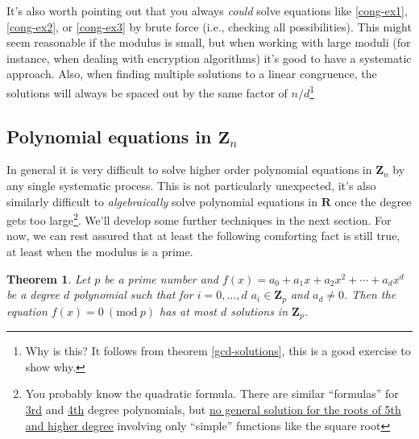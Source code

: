 \documentclass[12pt]{article}
\numberwithin{equation}{subsection}
\newtheorem{thm}[subsection]{Theorem}
\theoremstyle{note}
\newtheorem{remark}[subsection]{Remark}
\newcommand{\Mod}[1]{\ (\mathrm{mod}\ #1)}
\begin{document}
It's also worth pointing out that you always \textit{could} solve equations like \eqref{cong-ex1}, \eqref{cong-ex2}, or \eqref{cong-ex3} by brute force (i.e., checking all possibilities). This might seem reasonable if the modulus is small, but when working with large moduli (for instance, when dealing with encryption algorithms) it's good to have a systematic approach. Also, when finding multiple solutions to a linear congruence, the solutions will always be spaced out by the same factor of $n/d$\footnote{Why is this? It follows from theorem \ref{gcd-solutions}, this is a good exercise to show why.}



\subsection{Polynomial equations in $\mathbf{Z}_n$}
In general it is very difficult to solve higher order polynomial equations in $\mathbf{Z}_n$ by any single systematic process. This is not particularly unexpected, it's also similarly difficult to \textit{algebraically} solve polynomial equations in $\mathbf{R}$ once the degree gets too large\footnote{You probably know the quadratic formula. There are similar ``formulas'' for \href{https://en.wikipedia.org/wiki/Cubic_equation\#General_cubic_formula}{3rd} and \href{https://en.wikipedia.org/wiki/Quartic_equation\#The_general_case}{4th} degree polynomials, but \href{https://en.wikipedia.org/wiki/Abe\%E2\%80\%93Ruffini_theorem}{no general solution for the roots of 5th and higher degree} involving only ``simple'' functions like the square root}. We'll develop some further techniques in the next section. For now, we can rest assured that at least the following comforting fact is still true, at least when the modulus is a prime.

\begin{thm}\label{prime-roots}
Let $p$ be a prime number and $f(x)=a_0+a_1x+a_2x^2+\cdots+a_dx^d$ be a degree $d$ polynomial such that for $i=0,\dots,d$ $a_i\in\mathbf{Z}_p$ and $a_d\neq 0$. Then the equation $f(x)=0\Mod{p}$ has at most $d$ solutions in $\mathbf{Z}_p$. 

\end{thm}
\end{document}
